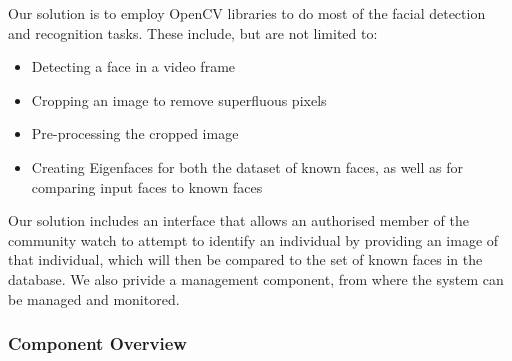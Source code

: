 \documentclass[a4paper]{article}
\begin{document}
			Our solution is to employ OpenCV libraries to do most of the facial detection and recognition tasks. These include, but are not limited to:
				
				\begin{itemize}
				
					\item Detecting a face in a video frame
					
					\item Cropping an image to remove superfluous pixels
					
					\item Pre-processing the cropped image
					
					\item Creating Eigenfaces for both the dataset of known faces, as well as for comparing input faces to known faces
				
				\end{itemize}
				
			Our solution includes an interface that allows an authorised member of the community watch to attempt to identify an individual by providing 
			an image of that individual, which will then be compared to the set of known faces in the database. We also privide a management component,
			from where the system can be managed and monitored.
			
			\subsubsection{Component Overview}
			
\end{document}
